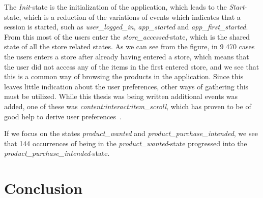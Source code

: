         The \emph{Init}-state is the initialization of the application, which leads to the \emph{Start}-state, which is a reduction of the variations of events which indicates that a session is started, such as \emph{user\_logged\_in}, \emph{app\_started} and \emph{app\_first\_started}.
        From this most of the users enter the \emph{store\_accessed}-state, which is the shared state of all the store related states.
        As we can see from the figure, in 9 470 cases the users enters a store after already having entered a store, which means that the user did not access any of the items in the first entered store, and we see that this is a common way of browsing the products in the application. Since this leaves little indication about the user preferences, other ways of gathering this must be utilized.
        While this thesis was being written additional events was added, one of these was \emph{content:interact:item\_scroll}, which has proven to be of good help to derive user preferences~\cite{Claypool01inferringuser}.

        If we focus on the states \emph{product\_wanted} and \emph{product\_purchase\_intended}, we see that 144 occurrences of being in the \emph{product\_wanted}-state progressed into the \emph{product\_purchase\_intended}-state.










\section{Conclusion}
\label{sec:dataset-conclusion}



